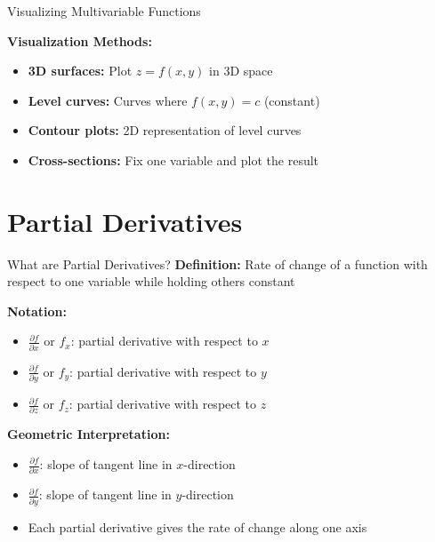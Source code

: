 \documentclass[aspectratio=169]{beamer}
\begin{document}
\begin{frame}{Visualizing Multivariable Functions}
\begin{center}
\end{center}

\textbf{Visualization Methods:}
\begin{itemize}
    \item \textbf{3D surfaces:} Plot $z = f(x,y)$ in 3D space
    \item \textbf{Level curves:} Curves where $f(x,y) = c$ (constant)
    \item \textbf{Contour plots:} 2D representation of level curves
    \item \textbf{Cross-sections:} Fix one variable and plot the result
\end{itemize}
\end{frame}

\section{Partial Derivatives}

\begin{frame}{What are Partial Derivatives?}
\textbf{Definition:} Rate of change of a function with respect to one variable while holding others constant

\textbf{Notation:}
\begin{itemize}
    \item $\frac{\partial f}{\partial x}$ or $f_x$: partial derivative with respect to $x$
    \item $\frac{\partial f}{\partial y}$ or $f_y$: partial derivative with respect to $y$
    \item $\frac{\partial f}{\partial z}$ or $f_z$: partial derivative with respect to $z$
\end{itemize}

\textbf{Geometric Interpretation:}
\begin{itemize}
    \item $\frac{\partial f}{\partial x}$: slope of tangent line in $x$-direction
    \item $\frac{\partial f}{\partial y}$: slope of tangent line in $y$-direction
    \item Each partial derivative gives the rate of change along one axis
\end{itemize}
\end{frame}
\end{document}
